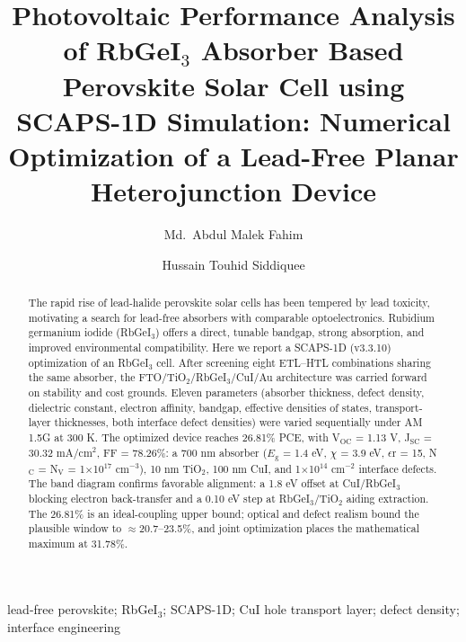 \documentclass[review]{elsarticle}
\begin{document}
\begin{frontmatter}

\title{Photovoltaic Performance Analysis of RbGeI$_{3}$ Absorber Based Perovskite Solar Cell using SCAPS-1D Simulation: Numerical Optimization of a Lead-Free Planar Heterojunction Device}
\author[lus]{Md.\ Abdul Malek Fahim}
\author[lus]{Hussain Touhid Siddiquee}
\address[lus]{Department of Electrical and Electronic Engineering, Leading University, Sylhet, Bangladesh}
\begin{abstract}
The rapid rise of lead-halide perovskite solar cells has been tempered by lead toxicity, motivating a search for lead-free absorbers with comparable optoelectronics. Rubidium germanium iodide (RbGeI$_{3}$) offers a direct, tunable bandgap, strong absorption, and improved environmental compatibility. Here we report a SCAPS-1D (v3.3.10) optimization of an RbGeI$_{3}$ cell. After screening eight ETL--HTL combinations sharing the same absorber, the FTO/\allowbreak{}TiO$_{2}$/RbGeI$_{3}$/CuI/\allowbreak{}Au architecture was carried forward on stability and cost grounds. Eleven parameters (absorber thickness, defect density, dielectric constant, electron affinity, bandgap, effective densities of states, transport-layer thicknesses, both interface defect densities) were varied sequentially under AM 1.5G at 300 K. The optimized device reaches 26.81\% PCE, with V$_{\mathrm{OC}}$ = 1.13 V, J$_{\mathrm{SC}}$ = 30.32 mA/cm$^{2}$, FF = 78.26\%: a 700 nm absorber ($E_{\mathrm{g}}$ = 1.4 eV, $\chi$ = 3.9 eV, $\epsilon$r = 15, N$_{\mathrm{C}}$ = N$_{\mathrm{V}}$ = 1$\times$10$^{17}$ cm$^{-3}$), 10 nm TiO$_{2}$, 100 nm CuI, and 1$\times$10$^{14}$ cm$^{-2}$ interface defects. The band diagram confirms favorable alignment: a 1.8 eV offset at CuI/\allowbreak{}RbGeI$_{3}$ blocking electron back-transfer and a 0.10 eV step at RbGeI$_{3}$/TiO$_{2}$ aiding extraction. The 26.81\% is an ideal-coupling upper bound; optical and defect realism bound the plausible window to $\approx$20.7--23.5\%, and joint optimization places the mathematical maximum at 31.78\%.
\end{abstract}
\begin{keyword}
lead-free perovskite; RbGeI$_{3}$; SCAPS-1D; CuI hole transport layer; defect density; interface engineering
\end{keyword}
\end{frontmatter}
\end{document}
